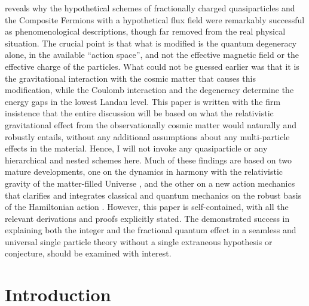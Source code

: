 \documentclass[aps,preprint,12pt,tightenlines]{revtex4}%
\begin{document}
reveals why the hypothetical schemes of fractionally charged quasiparticles
and the Composite Fermions with a hypothetical flux field were remarkably
successful as phenomenological descriptions, though far removed from the real
physical situation. The crucial point is that what is modified is the quantum
degeneracy alone, in the available \textquotedblleft action
space\textquotedblright, and not the effective magnetic field or the effective
charge of the particles. What could not be guessed earlier was that it is the
gravitational interaction with the cosmic matter that causes this
modification, while the Coulomb interaction and the degeneracy determine the
energy gaps in the lowest Landau level. This paper is written with the firm
insistence that the entire discussion will be based on what the relativistic
gravitational effect from the observationally cosmic matter would naturally
and robustly entails, without any additional assumptions about any
multi-particle effects in the material. Hence, I will not invoke any
quasiparticle or any hierarchical and nested schemes here. Much of these
findings are based on two mature developments, one on the dynamics in harmony
with the relativistic gravity of the matter-filled Universe \cite{Unni-Cosrel}%
, and the other on a new action mechanics that clarifies and integrates
classical and quantum mechanics on the robust basis of the Hamiltonian action
\cite{Unni-RQM}. However, this paper is self-contained, with all the relevant
derivations and proofs explicitly stated. The demonstrated success in
explaining both the integer and the fractional quantum effect in a seamless
and universal single particle theory without a single extraneous hypothesis
or conjecture, should be examined with interest.

\section{Introduction}
\end{document}
